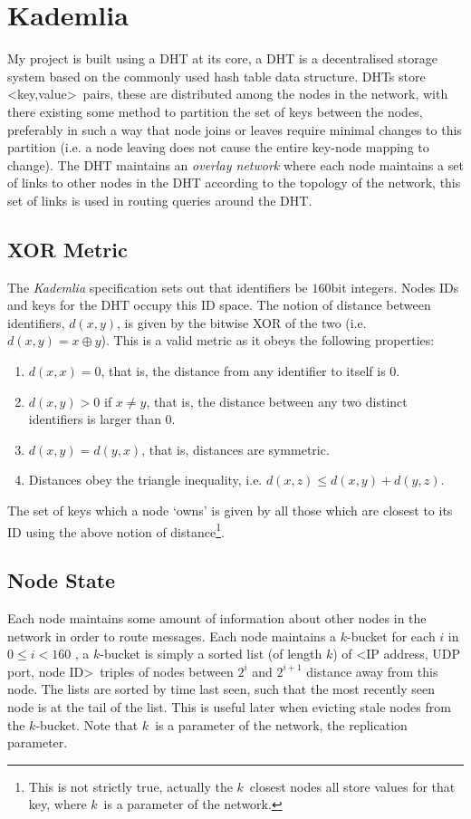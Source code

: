 \documentclass[12pt,notitlepage,a4paper]{report}
\newcommand{\kademlia}{\emph{Kademlia}}
\newcommand{\K}{$k$}
\begin{document}
	\section{Kademlia}
	My project is built using a DHT at its core, a DHT is a decentralised storage system based on the commonly used hash table data structure. DHTs store \textless key,value\textgreater~pairs, these are distributed among the nodes in the network, with there existing some method to partition the set of keys between the nodes, preferably in such a way that node joins or leaves require minimal changes to this partition (i.e. a node leaving does not cause the entire key-node mapping to change). The DHT maintains an \emph{overlay network} where each node maintains a set of links to other nodes in the DHT according to the topology of the network, this set of links is used in routing queries around the DHT.
	
	\subsection{XOR Metric}
	The \kademlia{} specification sets out that identifiers be $160$bit integers. Nodes IDs and keys for the DHT occupy this ID space. The notion of distance between identifiers, $d(x,y)$, is given by the bitwise XOR of the two (i.e. $d(x,y) = x \oplus y$). This is a valid metric as it obeys the following properties:
	\begin{enumerate}
		\item $d(x,x) = 0$, that is, the distance from any identifier to itself is $0$.
		\item $d(x,y) > 0$ if $x \neq y$, that is, the  distance between any two distinct identifiers is larger than $0$.
		\item $d(x,y) = d(y,x)$, that is, distances are symmetric.
		\item Distances obey  the triangle inequality, i.e. $d(x,z) \leq d(x,y) + d(y,z)$.
	\end{enumerate}
	The set of keys which a node `owns' is given by all those which are closest to its ID using the above notion of distance\footnote{This is not strictly true, actually the \K~closest nodes all store values for that key, where \K~is a parameter of the network.}.
	
	\subsection{Node State}
	Each node maintains some amount of information about other nodes in the network in order to route messages. Each node maintains a \K-bucket for each $i$ in $0 \leq i < 160$ , a \K-bucket is simply a sorted list (of length \K) of \textless IP address, UDP port, node ID\textgreater~triples of nodes between $2^i$ and $2^{i+1}$ distance away from this node. The lists are sorted by time last seen, such that the most recently seen node is at the tail of the list. This is useful later when evicting stale nodes from the \K-bucket. Note that \K~is a parameter of the network, the replication parameter.
	
\end{document}
